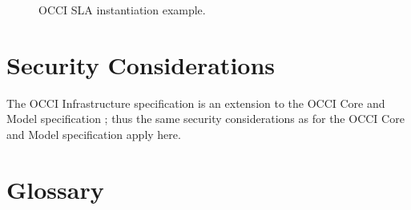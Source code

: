 \documentclass[10pt,a4paper]{article}
\begin{document}
\begin{figure}[!h]
	{\centering {} \par}
	\caption{OCCI SLA instantiation example.}
	\label{fig:occi-slas-example}
\end{figure}




\section{Security Considerations}
The OCCI Infrastructure specification is an extension to the OCCI Core
and Model specification \cite{occi:core}; thus the same security
considerations as for the OCCI Core and Model specification apply
here.

\section{Glossary}
\label{sec:glossary}
%
\end{document}
